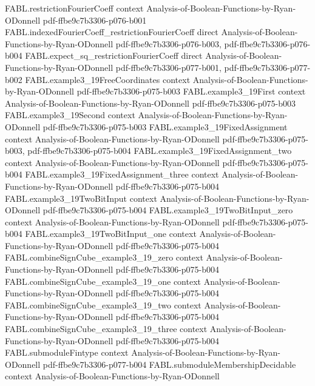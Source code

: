 \begin{theorem}
\proofstep
  {FABL.restrictionFourierCoeff}
  {context}
  {Analysis-of-Boolean-Functions-by-Ryan-ODonnell}
  {pdf-ffbe9c7b3306-p076-b001}
\proofstep
  {FABL.indexedFourierCoeff_restrictionFourierCoeff}
  {direct}
  {Analysis-of-Boolean-Functions-by-Ryan-ODonnell}
  {pdf-ffbe9c7b3306-p076-b003,
    pdf-ffbe9c7b3306-p076-b004}
\proofstep
  {FABL.expect_sq_restrictionFourierCoeff}
  {direct}
  {Analysis-of-Boolean-Functions-by-Ryan-ODonnell}
  {pdf-ffbe9c7b3306-p077-b001,
    pdf-ffbe9c7b3306-p077-b002}
\proofstep
  {FABL.example3_19FreeCoordinates}
  {context}
  {Analysis-of-Boolean-Functions-by-Ryan-ODonnell}
  {pdf-ffbe9c7b3306-p075-b003}
\proofstep
  {FABL.example3_19First}
  {context}
  {Analysis-of-Boolean-Functions-by-Ryan-ODonnell}
  {pdf-ffbe9c7b3306-p075-b003}
\proofstep
  {FABL.example3_19Second}
  {context}
  {Analysis-of-Boolean-Functions-by-Ryan-ODonnell}
  {pdf-ffbe9c7b3306-p075-b003}
\proofstep
  {FABL.example3_19FixedAssignment}
  {context}
  {Analysis-of-Boolean-Functions-by-Ryan-ODonnell}
  {pdf-ffbe9c7b3306-p075-b003,
    pdf-ffbe9c7b3306-p075-b004}
\proofstep
  {FABL.example3_19FixedAssignment_two}
  {context}
  {Analysis-of-Boolean-Functions-by-Ryan-ODonnell}
  {pdf-ffbe9c7b3306-p075-b004}
\proofstep
  {FABL.example3_19FixedAssignment_three}
  {context}
  {Analysis-of-Boolean-Functions-by-Ryan-ODonnell}
  {pdf-ffbe9c7b3306-p075-b004}
\proofstep
  {FABL.example3_19TwoBitInput}
  {context}
  {Analysis-of-Boolean-Functions-by-Ryan-ODonnell}
  {pdf-ffbe9c7b3306-p075-b004}
\proofstep
  {FABL.example3_19TwoBitInput_zero}
  {context}
  {Analysis-of-Boolean-Functions-by-Ryan-ODonnell}
  {pdf-ffbe9c7b3306-p075-b004}
\proofstep
  {FABL.example3_19TwoBitInput_one}
  {context}
  {Analysis-of-Boolean-Functions-by-Ryan-ODonnell}
  {pdf-ffbe9c7b3306-p075-b004}
\proofstep
  {FABL.combineSignCube_example3_19_zero}
  {context}
  {Analysis-of-Boolean-Functions-by-Ryan-ODonnell}
  {pdf-ffbe9c7b3306-p075-b004}
\proofstep
  {FABL.combineSignCube_example3_19_one}
  {context}
  {Analysis-of-Boolean-Functions-by-Ryan-ODonnell}
  {pdf-ffbe9c7b3306-p075-b004}
\proofstep
  {FABL.combineSignCube_example3_19_two}
  {context}
  {Analysis-of-Boolean-Functions-by-Ryan-ODonnell}
  {pdf-ffbe9c7b3306-p075-b004}
\proofstep
  {FABL.combineSignCube_example3_19_three}
  {context}
  {Analysis-of-Boolean-Functions-by-Ryan-ODonnell}
  {pdf-ffbe9c7b3306-p075-b004}
\proofstep
  {FABL.submoduleFintype}
  {context}
  {Analysis-of-Boolean-Functions-by-Ryan-ODonnell}
  {pdf-ffbe9c7b3306-p077-b004}
\proofstep
  {FABL.submoduleMembershipDecidable}
  {context}
  {Analysis-of-Boolean-Functions-by-Ryan-ODonnell}

\end{theorem}
